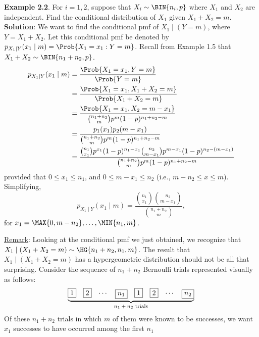 \begin{Example}
    \textbf{Example 2.2}. For $ i=1,2 $, suppose that $ X_i \sim \BIN{n_i,p} $ where $ X_1 $ and $ X_2 $ are independent. Find the
    conditional distribution of $ X_1 $ given $ X_1+X_2=m $.
    \tcblower{}
    \textbf{Solution}: We want to find the conditional pmf of $ X_1\mid (Y=m) $, where $ Y=X_1+X_2 $. Let this conditional
    pmf be denoted by $ p_{X_1\mid Y}(x_1\mid m)=\Prob{X_1=x_1\given Y=m} $.
    Recall from Example 1.5 that $ X_1+X_2 \sim \BIN{n_1+n_2,p} $.
    \begin{align*}
        p_{X_1\mid Y}(x_1\mid m)
         & =\frac{\Prob{X_1=x_1,Y=m}}{\Prob{Y=m}}                                                                                               \\
         & =\frac{\Prob{X_1=x_1,X_1+X_2=m}}{\Prob{X_1+X_2=m}}                                                                                   \\
         & =\frac{\Prob{X_1=x_1,X_2=m-x_1}}{\binom{n_1+n_2}{m}p^m (1-p)^{n_1+n_2-m}}                                                            \\
         & =\frac{p_1(x_1)p_2(m-x_1)}{\binom{n_1+n_2}{m}p^m (1-p)^{n_1+n_2-m}}                                                                  \\
         & =\frac{\binom{n_1}{x_1}p^{x_1}(1-p)^{n_1-x_1}\binom{n_2}{m-x_1}p^{m-x_1}(1-p)^{n_2-(m-x_1)}}{\binom{n_1+n_2}{m}p^m(1-p)^{n_1+n_2-m}}
    \end{align*}
    provided that $ 0\le x_1\le n_1 $, and $ 0\le m-x_1\le n_2 $ (i.e., $ m-n_2\le x\le m $). Simplifying,
    \[p_{X_1\mid Y}(x_1\mid m)=\frac{\binom{n_1}{x_1}\binom{n_2}{m-x_1}}{\binom{n_1+n_2}{m}},\]
    for $ x_1=\MAX{0,m-n_2},\ldots,\MIN{n_1,m} $.
\end{Example}
\underline{Remark}: Looking at the conditional pmf we just obtained, we recognize that $ X_1\mid(X_1+X_2=m)\sim \HG{n_1+n_2,n_1,m} $.
The result that $ X_1\mid(X_1+X_2=m) $ has a hypergeometric distribution should not be all that surprising. Consider the sequence of $ n_1+n_2 $
Bernoulli trials represented visually as follows:
\[ \underbrace{\begin{matrix}
            \boxed{1} & \boxed{2} & \cdots & \boxed{n_1} & \boxed{1} & \boxed{2} & \cdots & \boxed{n_2}
        \end{matrix}}_{\text{$ n_1+n_2 $ trials}} \]
Of these $ n_1+n_2 $ trials in which $ m $ of them were known to be successes, we want $ x_1 $ successes to have occurred among the first $ n_1 $
